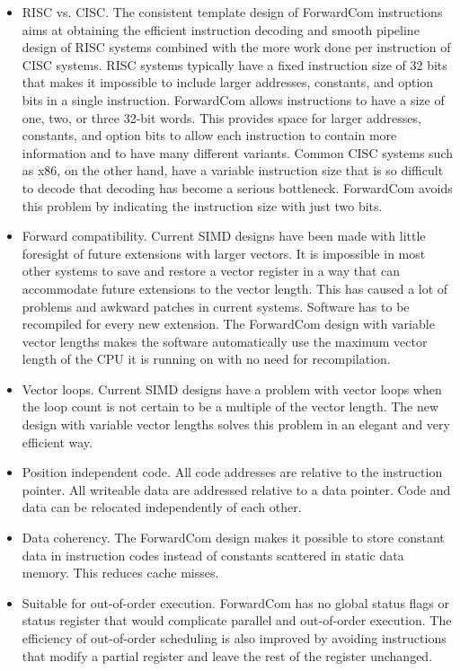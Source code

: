 \documentclass[forwardcom.tex]{subfiles}
\begin{document}
\begin{itemize}
\item RISC vs. CISC. The consistent template design of ForwardCom instructions aims at obtaining the efficient instruction decoding and smooth pipeline design of RISC systems combined with the more work done per instruction of CISC systems. RISC systems typically have a fixed instruction size of 32 bits that makes it impossible to include larger addresses, constants, and option bits in a single instruction. ForwardCom allows instructions to have a size of one, two, or three 32-bit words. This provides space for larger addresses, constants, and option bits to allow each instruction to contain more information and to have many different variants. Common CISC systems such as x86, on the other hand, have a variable instruction size that is so difficult to decode that decoding has become a serious bottleneck. ForwardCom avoids this problem by indicating the instruction size with just two bits.

\item Forward compatibility. Current SIMD designs have been made with little foresight of future extensions with larger vectors. It is impossible in most  other systems to save and restore a vector register in a way that can accommodate future extensions to the vector length. This has caused a lot of problems and awkward patches in current systems. Software has to be recompiled for every new extension. The ForwardCom design with variable vector lengths makes the software automatically use the maximum vector length of the CPU it is running on with no need for recompilation.

\item Vector loops. Current SIMD designs have a problem with vector loops when the loop count is not certain to be a multiple of the vector length. The new design with variable vector lengths solves this problem in an elegant and very efficient way.

\item Position independent code. All code addresses are relative to the instruction pointer. All writeable data are addressed relative to a data  pointer. Code and data can be relocated independently of each other.

\item Data coherency. The ForwardCom design makes it possible to store constant data in instruction codes instead of constants scattered in static data memory. This reduces cache misses.

\item Suitable for out-of-order execution. ForwardCom has no global status flags or status register that would complicate parallel and out-of-order execution. The efficiency of out-of-order scheduling is also improved by avoiding instructions that modify a partial register and leave the rest of the register unchanged.


\end{itemize}
\end{document}
